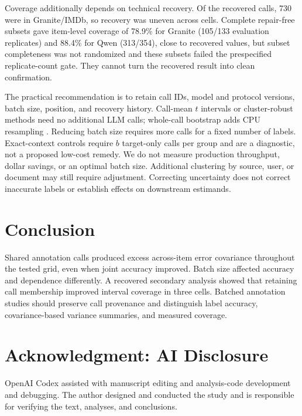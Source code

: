 \documentclass[conference]{IEEEtran}
\begin{document}
Coverage additionally depends on technical recovery. Of the recovered calls, 730 were in Granite/IMDb, so recovery was uneven across cells. Complete repair-free subsets gave item-level coverage of 78.9\% for Granite (105/133 evaluation replicates) and 88.4\% for Qwen (313/354), close to recovered values, but subset completeness was not randomized and these subsets failed the prespecified replicate-count gate. They cannot turn the recovered result into clean confirmation.

The practical recommendation is to retain call IDs, model and protocol versions, batch size, position, and recovery history. Call-mean $t$ intervals or cluster-robust methods need no additional LLM calls; whole-call bootstrap adds CPU resampling \cite{cameron2015cluster,mackinnon2023cluster,field2007bootstrap}. Reducing batch size requires more calls for a fixed number of labels. Exact-context controls require $b$ target-only calls per group and are a diagnostic, not a proposed low-cost remedy. We do not measure production throughput, dollar savings, or an optimal batch size. Additional clustering by source, user, or document may still require adjustment. Correcting uncertainty does not correct inaccurate labels or establish effects on downstream estimands.

\section{Conclusion}
Shared annotation calls produced excess across-item error covariance throughout the tested grid, even when joint accuracy improved. Batch size affected accuracy and dependence differently. A recovered secondary analysis showed that retaining call membership improved interval coverage in three cells. Batched annotation studies should preserve call provenance and distinguish label accuracy, covariance-based variance summaries, and measured coverage.

\section*{Acknowledgment: AI Disclosure}
OpenAI Codex assisted with manuscript editing and analysis-code development and debugging. The author designed and conducted the study and is responsible for verifying the text, analyses, and conclusions.


\end{document}
